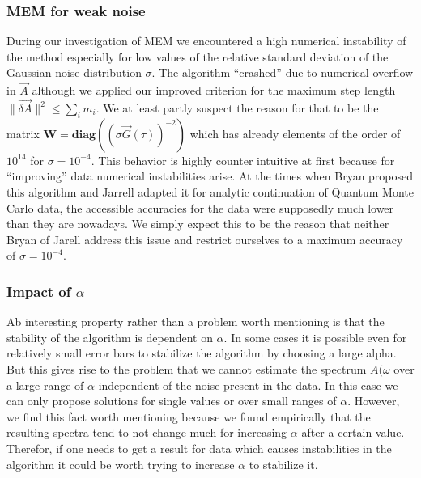 \subsubsection*{MEM for weak noise}
During our investigation of MEM we encountered a high numerical instability of the method especially for low values of the relative standard deviation of the Gaussian noise distribution $\sigma$.
The algorithm  ``crashed'' due to numerical overflow in $\vec A$ although we applied our improved criterion for the maximum step length $\parallel \vec{\delta A} \parallel^2 \leq \sum_i m_i$.
We at least partly suspect the reason for that to be the matrix $\mathbf{W} = \mathbf{diag}((\sigma \vec G(\tau))^{-2})$ which has already elements of the order of $10^{14}$ for $\sigma = 10^{-4}$.
This behavior is highly counter intuitive at first because for ``improving'' data numerical instabilities arise.
At the times when Bryan proposed this algorithm and Jarrell adapted it for analytic continuation of Quantum Monte Carlo data, the accessible accuracies for the data were supposedly much lower than they are nowadays. We simply expect this to be the reason that neither Bryan of Jarell address this issue and restrict ourselves to a maximum accuracy of $\sigma = 10^{-4}$.
\subsubsection*{Impact of $\alpha$}
Ab interesting property rather than a problem worth mentioning is that the stability of the algorithm is dependent on $\alpha$.
In some cases it is possible even for relatively small error bars to stabilize the algorithm by choosing a large alpha.
But this gives rise to the problem that we cannot estimate the spectrum $A(\omega$ over a large range of $\alpha$ independent of the noise present in the data.
In this case we can only propose solutions for single values or over small ranges of $\alpha$.
However, we find this fact worth mentioning because we found empirically that the resulting spectra tend to not change much for increasing $\alpha$ after a certain value. Therefor, if one needs to get a result for data which causes instabilities in the algorithm it could be worth trying to increase $\alpha$ to stabilize it.
